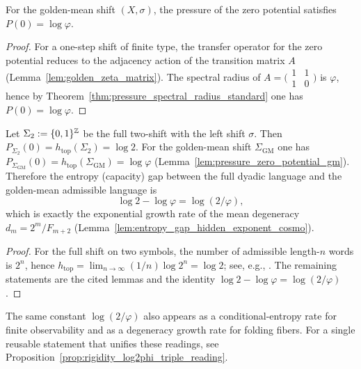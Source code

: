 \begin{lemma}[Golden-mean normalization: $P(0)=\log\varphi$]
\label{lem:pressure_zero_potential_gm}
\MathTag For the golden-mean shift $(X,\sigma)$, the pressure of the zero potential satisfies $P(0)=\log\varphi$.
\end{lemma}
\begin{proof}
For a one-step shift of finite type, the transfer operator for the zero potential reduces to the adjacency action of the transition matrix $A$ (Lemma~\ref{lem:golden_zeta_matrix}).
The spectral radius of $A=\bigl(\begin{smallmatrix}1&1\\1&0\end{smallmatrix}\bigr)$ is $\varphi$, hence by Theorem~\ref{thm:pressure_spectral_radius_standard} one has $P(0)=\log\varphi$.
\end{proof}

\begin{lemma}\label{lem:full_shift_entropy_gap}
\MathTag Let $\Sigma_2:=\{0,1\}^{\mathbb{Z}}$ be the full two-shift with the left shift $\sigma$.
Then $P_{\Sigma_2}(0)=h_{\mathrm{top}}(\Sigma_2)=\log 2$.
For the golden-mean shift $\Sigma_{\mathrm{GM}}$ one has $P_{\Sigma_{\mathrm{GM}}}(0)=h_{\mathrm{top}}(\Sigma_{\mathrm{GM}})=\log\varphi$ (Lemma~\ref{lem:pressure_zero_potential_gm}).
Therefore the entropy (capacity) gap between the full dyadic language and the golden-mean admissible language is
\[
\log 2-\log\varphi=\log(2/\varphi),
\]
which is exactly the exponential growth rate of the mean degeneracy $d_m=2^m/F_{m+2}$ (Lemma~\ref{lem:entropy_gap_hidden_exponent_cosmo}).
\end{lemma}
\begin{proof}
For the full shift on two symbols, the number of admissible length-$n$ words is $2^n$, hence $h_{\mathrm{top}}=\lim_{n\to\infty}(1/n)\log 2^n=\log 2$; see, e.g., \cite{LindMarcus1995}.
The remaining statements are the cited lemmas and the identity $\log 2-\log\varphi=\log(2/\varphi)$.
\end{proof}

\begin{remark}\label{rem:full_shift_entropy_gap_bridge}
\AuditTag The same constant $\log(2/\varphi)$ also appears as a conditional-entropy rate for finite observability and as a degeneracy growth rate for folding fibers.
For a single reusable statement that unifies these readings, see Proposition~\ref{prop:rigidity_log2phi_triple_reading}.
\end{remark}

